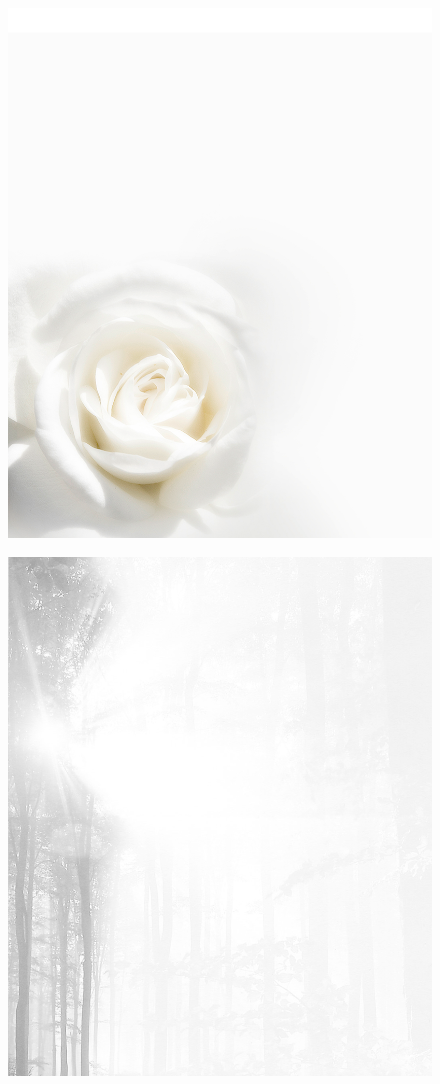 \documentclass[ngerman,a4paper,11pt]{scrreprt}
\begin{document}
\begin{figure}[H]
\centering
\includegraphics[width=\textwidth,height=.8\textheight]{Bilder/Bilder/./750_0010_8422_Hintergrund_weisse_Rose_Todesanzeige.png}
\end{figure}

\begin{figure}[H]
\centering
\includegraphics[width=\textwidth,height=.8\textheight]{Bilder/Bilder/./750_028_59925_sz_todes_ta_.png}
\end{figure}
\end{document}
